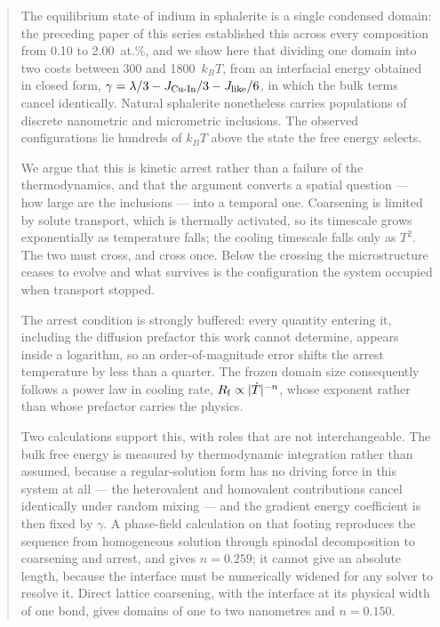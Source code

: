 \documentclass[11pt,a4paper]{article}
\begin{document}
\begin{abstract}
\noindent
The equilibrium state of indium in sphalerite is a single condensed domain: the
preceding paper of this series established this across every composition from
0.10 to 2.00~at.\%, and we show here that dividing one domain into two costs
between 300 and 1800~$k_BT$, from an interfacial energy obtained in closed form,
$\gamma = \lambda/3 - J_{\rm Cu\text{-}In}/3 - J_{\rm like}/6$, in which the bulk
terms cancel identically. Natural sphalerite nonetheless carries populations of
discrete nanometric and micrometric inclusions. The observed configurations lie
hundreds of $k_BT$ above the state the free energy selects.

We argue that this is kinetic arrest rather than a failure of the
thermodynamics, and that the argument converts a spatial question --- how large
are the inclusions --- into a temporal one. Coarsening is limited by solute
transport, which is thermally activated, so its timescale grows exponentially as
temperature falls; the cooling timescale falls only as $T^2$. The two must
cross, and cross once. Below the crossing the microstructure ceases to evolve
and what survives is the configuration the system occupied when transport
stopped.

The arrest condition is strongly buffered: every quantity entering it, including
the diffusion prefactor this work cannot determine, appears inside a logarithm,
so an order-of-magnitude error shifts the arrest temperature by less than a
quarter. The frozen domain size consequently follows a power law in cooling
rate, $R_{\rm f} \propto |\dot{T}|^{-n}$, whose exponent rather than whose
prefactor carries the physics.

Two calculations support this, with roles that are not interchangeable. The bulk
free energy is measured by thermodynamic integration rather than assumed,
because a regular-solution form has no driving force in this system at all --- the
heterovalent and homovalent contributions cancel identically under random
mixing --- and the gradient energy coefficient is then fixed by $\gamma$. A
phase-field calculation on that footing reproduces the sequence from
homogeneous solution through spinodal decomposition to coarsening and arrest,
and gives $n = 0.259$; it cannot give an absolute length, because the interface
must be numerically widened for any solver to resolve it. Direct lattice
coarsening, with the interface at its physical width of one bond, gives domains
of one to two nanometres and $n = 0.150$.


\end{abstract}
\end{document}

